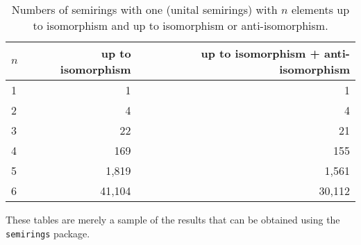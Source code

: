 \documentclass{article}
\theoremstyle{definition}
\theoremstyle{plain}
\begin{document}
\begin{table}[h]
  \centering
  \begin{tabular}{l|r|r}
    \toprule
    $n$ & up to isomorphism & up to isomorphism + anti-isomorphism \\
    \midrule
    1 & 1         & 1      \\
    2 & 4         & 4      \\
    3 & 22        & 21     \\
    4 & 169       & 155    \\
    5 & 1,819     & 1,561  \\
    6 & 41,104    & 30,112 \\
  \end{tabular}
  \caption{Numbers of semirings with one (unital semirings) with $n$
  elements up to isomorphism and up to isomorphism or anti-isomorphism.}
  \label{tab:unital-semirings}
\end{table}

These tables are merely a sample of the results that can be obtained
using the \texttt{semirings} package.


\printbibliography
\end{document}
